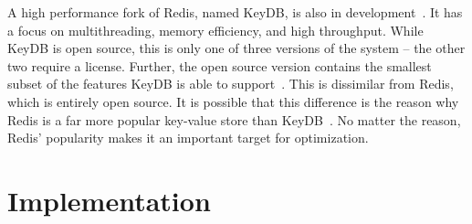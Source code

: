 \documentclass[sigconf, screen]{acmart}
\newcommand{\inlinecode}[1]{\texttt{#1}}
\begin{document}


A high performance fork of Redis, named KeyDB, is also in development~\cite{key-db-docs}.
It has a focus on multithreading, memory efficiency, and high throughput.
While KeyDB is open source, this is only one of three versions of the system -- the other two require a license.
Further, the open source version contains the smallest subset of the features KeyDB is able to support~\cite{key-db-versions}.
This is dissimilar from Redis, which is entirely open source.
It is possible that this difference is the reason why Redis is a far more popular key-value store than KeyDB~\cite{redis-key-db-comparison}.
No matter the reason, Redis' popularity makes it an important target for optimization.



\section{Implementation}
\end{document}
